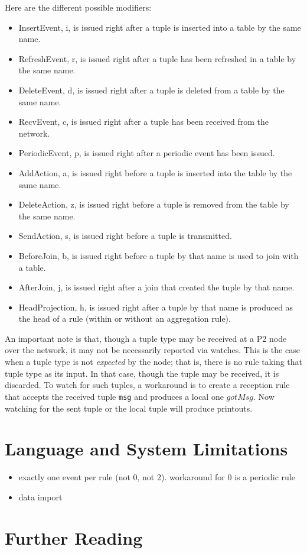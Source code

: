 \documentclass{article}
\begin{document}
Here are the different possible modifiers:
\begin{itemize}
\item InsertEvent, i, is issued right after a tuple is inserted into
  a table by the same name.
\item RefreshEvent, r, is issued right after a tuple has been refreshed
  in a table by the same name.
\item DeleteEvent, d, is issued right after a tuple is deleted from a
  table by the same name.
\item RecvEvent, c, is issued right after a tuple has been received from
  the network.
\item PeriodicEvent, p, is issued right after a periodic event has been issued.
\item AddAction, a, is issued right before a tuple is inserted into the
  table by the same name.
\item DeleteAction, z, is issued right before a tuple is removed from
  the table by the same name.
\item SendAction, s, is issued right before a tuple is transmitted.
\item BeforeJoin, b, is issued right before a tuple by that name is used
  to join with a table.
\item AfterJoin, j, is issued right after a join that created the tuple
  by that name.
\item HeadProjection, h, is issued right after a tuple by that name is
  produced as the head of a rule (within or without an aggregation rule).
\end{itemize}

An important note is that, though a tuple type may be received at a P2
node over the network, it may not be necessarily reported via
watches. This is the case when a tuple type is not \emph{expected} by
the node; that is, there is no rule taking that tuple type as its
input.  In that case, though the tuple may be received, it is
discarded.  To watch for such tuples, a workaround is to create a
reception rule that accepts the received tuple \lstinline$msg$ and produces a local
one \lsginline$gotMsg$.  Now watching for the sent tuple or the local
tuple will produce printouts.


\section{Language and System Limitations}
\begin{itemize}
\item exactly one event per rule (not 0, not 2).  workaround for 0 is
      a periodic rule
\item data import
\end{itemize}
\section{Further Reading}
\end{document}
